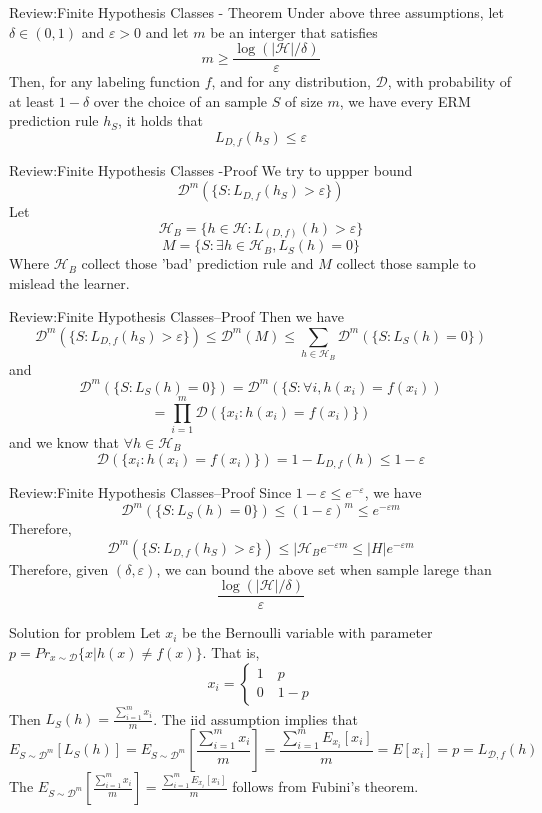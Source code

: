 \documentclass{beamer}
\begin{document}
\begin{frame}{Review:Finite Hypothesis Classes - Theorem}
	Under above three assumptions, let $\delta \in (0,1)$ and $\varepsilon>0$ and let $m$ be an interger that satisfies 
	\[m \geq \frac{\log (|\mathcal{H}|/ \delta)}{\varepsilon}\]
	Then, for any labeling function $f$, and for any distribution, $\mathcal{D}$, with probability of at least $1-\delta$ over the choice of an sample $S$ of size $m$, we have every ERM prediction rule $h_S$, it holds that 
	\[L_{D,f} (h_S) \leq \varepsilon\]
	
\end{frame}
\begin{frame}{Review:Finite Hypothesis Classes -Proof}
	We try to uppper bound
	\[\mathcal{D}^m (\{S: L_{D,f} (h_S)> \varepsilon\})\]
	Let 
	\[\mathcal{H}_B = \{h \in \mathcal{H}: L_{(D,f)}(h) > \varepsilon\}\]
	\[M = \{S: \exists h \in \mathcal{H}_B,L_S(h)=0\}\]
	Where $\mathcal{H}_B$ collect those 'bad' prediction rule and $M$ collect those sample to mislead the learner.
\end{frame}
\begin{frame}{Review:Finite Hypothesis Classes--Proof}
	Then we have 
	\[\mathcal{D}^m(\{S: L_{D,f} (h_S)> \varepsilon\}) \leq \mathcal{D}^m(M) \leq \sum_{h \in \mathcal{H}_B} \mathcal{D}^m(\{S: L_S(h)=0\})\]
	and 
	\[\mathcal{D}^m(\{S: L_S(h)=0\})= \mathcal{D}^m(\{S: \forall i, h(x_i) = f(x_i))\]
		\[=\prod^m_{i=1} \mathcal{D}(\{x_i: h(x_i) = f(x_i)\})\]
	and we know that $\forall h \in \mathcal{H}_B$
	\[\mathcal{D}(\{x_i: h(x_i) = f(x_i)\}) = 1 - L_{D,f} (h) \leq 1 - \varepsilon\]
\end{frame}
\begin{frame}{Review:Finite Hypothesis Classes--Proof}
	Since $1-\varepsilon \leq e^{-\varepsilon}$, we have 
	\[\mathcal{D}^m(\{S:L_S(h)=0\}) \leq (1- \varepsilon)^m \leq e^{-\varepsilon m}\]
	Therefore,
	\[\mathcal{D}^m (\{S: L_{D,f} (h_S)> \varepsilon\}) \leq |\mathcal{H}_B e^{-\varepsilon m} \leq |H| e^{-\varepsilon m}\]
	Therefore, given $(\delta,\varepsilon)$, we can bound the above set when sample larege than
	\[\frac{\log(|\mathcal{H}|/\delta)}{\varepsilon}\]
\end{frame}


\begin{frame}{Solution for problem}
	Let $x_i$ be the Bernoulli variable with parameter $p=Pr_{x \sim \mathcal{D}} \{x| h(x) \neq f(x)\}$. That is, 
	\[x_i = \begin{cases} 
			1 \quad p \\
			0 \quad 1-p
	\end{cases}\]
	Then $L_S(h) = \frac{\sum^m_{i=1} x_i}{m}$. The iid assumption implies that 
	\[E_{S \sim \mathcal{D}^m} [L_S(h)] = E_{S \sim \mathcal{D}^m} [\frac{\sum^m_{i=1} x_i}{m}] = \frac{\sum^m_{i=1} E_{x_i}[x_i]}{m} = E[x_i] = p = L_{\mathcal{D},f} (h)\]
	The $E_{S \sim \mathcal{D}^m} [\frac{\sum^m_{i=1} x_i}{m}]= \frac{\sum^m_{i=1} E_{x_i}[x_i]}{m}$ follows from Fubini's theorem.
\end{frame}
\end{document}
